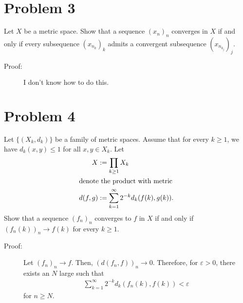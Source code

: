 \documentclass[8pt]{extarticle}
\begin{document}
  \section{Problem 3}%
  Let $X$ be a metric space. Show that a sequence $(x_n)_n$ converges in $X$ if and only if every subsequence $\left(x_{n_k}\right)_k$ admits a convergent subsequence $\left(x_{n_{k_j}}\right)_j$.
  \begin{description}
    \item[Proof:] I don't know how to do this.
  \end{description}
  \section{Problem 4}%
  Let $\{(X_k,d_k)\}$ be a family of metric spaces. Assume that for every $k\geq 1$, we have $d_k(x,y)\leq 1$ for all $x,y\in X_k$. Let 
  \begin{align*}
    X &:= \prod_{k\geq 1}X_k\\
    \intertext{denote the product with metric}
    d(f,g) &:= \sum_{k=1}^{\infty}2^{-k}d_k(f(k),g(k)).
  \end{align*}
  Show that a sequence $(f_n)_n$ converges to $f$ in $X$ if and only if $(f_n(k))_n\rightarrow f(k)$ for every $k\geq 1$.
    \begin{description}
      \item[Proof:] Let $(f_n)_n\rightarrow f$. Then, $(d(f_n,f))_n\rightarrow 0$. Therefore, for $\varepsilon > 0$, there exists an $N$ large such that
        \begin{align*}
          \sum_{k=1}^{\infty}2^{-k}d_k(f_n(k),f(k)) < \varepsilon
        \end{align*}
        for $n\geq N$. 
    \end{description}
\end{document}

